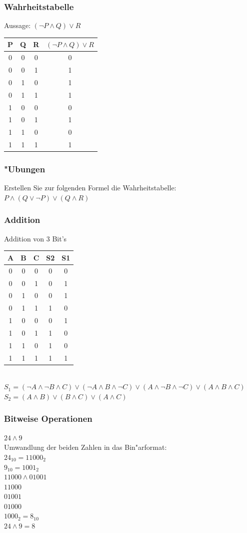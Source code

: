 \documentclass{beamer}
\begin{document}
\frame
{
	\frametitle{Wahrheitstabelle}
	Aussage: $(\lnot P \land Q) \lor R$\\
	\vspace{4mm}
	\begin{tabular}{c|c|c|c}
	P & Q & R & $(\lnot P \land Q) \lor R$ \\
	\hline
	0 & 0 & 0 & 0\\
	0 & 0 & 1 & 1\\
	0 & 1 & 0 & 1\\
	0 & 1 & 1 & 1\\
	1 & 0 & 0 & 0\\
	1 & 0 & 1 & 1\\
	1 & 1 & 0 & 0\\
	1 & 1 & 1 & 1\\
	\end{tabular}
}

\frame
{
	\frametitle{"Ubungen}
	Erstellen Sie zur folgenden Formel die Wahrheitstabelle:\\
	$P \land (Q \lor \lnot P) \lor (Q \land R)$
}

\frame
{
	\frametitle{Addition}
	{\small
	Addition von 3 Bit's\\
	\vspace{4mm}
	\begin{tabular}{c|c|c|c|c}
	A & B & C & S2 & S1 \\
	\hline
	0 & 0 & 0 & 0 & 0\\
	0 & 0 & 1 & 0 & 1\\
	0 & 1 & 0 & 0 & 1\\
	0 & 1 & 1 & 1 & 0\\
	1 & 0 & 0 & 0 & 1\\
	1 & 0 & 1 & 1 & 0\\
	1 & 1 & 0 & 1 & 0\\
	1 & 1 & 1 & 1 & 1\\
	\end{tabular}\\
	\vspace{4mm}
	$S_1 = (\lnot A \land \lnot B \land C) \lor (\lnot A \land B \land \lnot C) \lor (A \land \lnot B \land \lnot C) \lor (A \land B \land C)$\\
	$S_2 = (A \land B) \lor (B \land C) \lor (A \land C)$
	}
}

\frame
{
	\frametitle{Bitweise Operationen}
	$24 \land 9$\\
	\vspace{4mm}
	Umwandlung der beiden Zahlen in das Bin"arformat:\\
	$24_{10} = 11000_2$\\
	$9_{10} = 1001_2$\\
	\vspace{4mm}
	$11000 \land 01001$\\
	$11000$\\
	$01001$\\
	$01000$\\
	\vspace{4mm}
	$1000_2 = 8_{10}$\\
	$24 \land 9 = 8$
}
\end{document}
